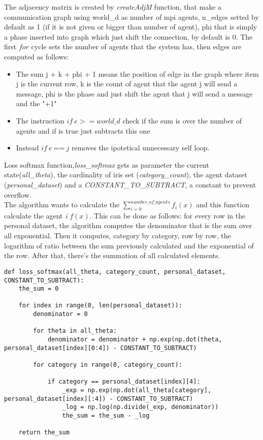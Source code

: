 \documentclass[a4paper,11pt,oneside]{book}
\begin{document}
The adjacency matrix is created by \textit{createAdjM} function, that make a communication graph using world\_d as number of
mpi agents, n\_edges  setted by default as 1 (if it is not given or
bigger than number of agent), phi that is simply a phase inserted into
graph which just shift the connection, by default is 0. The first $for$
cycle sets the number of agents that the system has, then edges are
computed as follows:
\begin{itemize}
    \item The sum j + k + phi + 1 means the position of edge in the
    graph where item j is the current row, k is the count of agent 
    that the agent j will send a message, phi is the phase and just
    shift the agent that j will send a message and the "+1" 

    \item The instruction $ if \ e >= world\_d $  check if the sum is over the number of
    agents and if is true just subtracts this one

    \item Instead $ if \ e \ $==$ \  j $ removes the ipotetical unnecessary self loop.
\end{itemize}


Loss softmax function,\textit{loss\_softmax} gets as parameter the current state(\textit{all\_theta}), the cardinality of
iris set (\textit{category\_count}), the agent dataset (\textit{personal\_dataset}) and a \textit{CONSTANT\_TO\_SUBTRACT}, a
constant to prevent overflow.\\
The algorithm wants to calculate the $\displaystyle\sum_{i=0}^{number\_of\_agents} f_{i}(x)$ and this function calculate the
agent \textit{i} $f(x)$. This can be done as follows: for every row in the personal dataset, the algorithm computes the
denominator that is the sum over all exponential. Then it computes, category by category, row by row, the logarithm of ratio
between the sum previously calculated and the exponential of the row. After that, there's the summation of all calculated
elements.

\begin{lstlisting}
def loss_softmax(all_theta, category_count, personal_dataset, CONSTANT_TO_SUBTRACT):
    the_sum = 0

    for index in range(0, len(personal_dataset)):
        denominator = 0

        for theta in all_theta:
            denominator = denominator + np.exp(np.dot(theta, personal_dataset[index][0:4]) - CONSTANT_TO_SUBTRACT)

        for category in range(0, category_count):

            if category == personal_dataset[index][4]:
                _exp = np.exp(np.dot(all_theta[category], personal_dataset[index][:4]) - CONSTANT_TO_SUBTRACT)
                _log = np.log(np.divide(_exp, denominator))
                the_sum = the_sum - _log

    return the_sum
\end{lstlisting}
\end{document}
